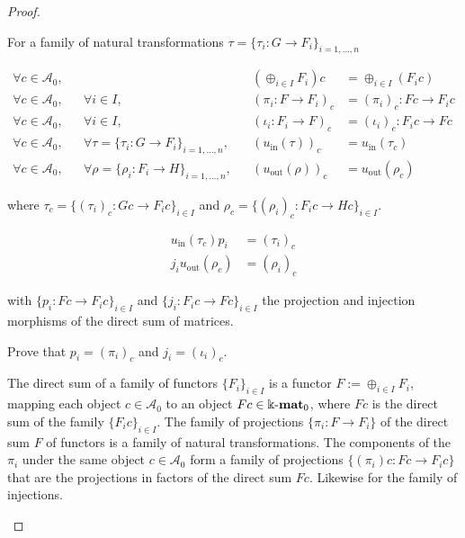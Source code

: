 \begin{proof}
\begin{enumerate}
\begin{subproof}[Proof of (ii)]
For a family of natural transformations $\tau = \{ \tau_{i} : G \rightarrow F_{i} \}_{i = 1,\dots,n}$

\begin{align*}
\forall c \in \mathcal{A}_{0},&& &&  (\oplus_{i \in I} F_{i}) c &= \oplus_{i \in I} (F_{i} c) \\
\forall c \in \mathcal{A}_{0},&& \forall i \in I,&& (\pi_{i} : F \rightarrow F_{i})_{c} &= (\pi_{i})_{c} : Fc \rightarrow F_{i} c \\
\forall c \in \mathcal{A}_{0},&& \forall i \in I,&& (\iota_{i} : F_{i} \rightarrow F)_{c} &= (\iota_{i})_{c} : F_{i} c \rightarrow Fc \\
\forall c \in \mathcal{A}_{0},&& \forall \tau = \{ \tau_{i} : G \rightarrow F_{i} \}_{i = 1,\dots,n},&&
(u_{\mathrm{in}}(\tau))_{c} &= u_{\mathrm{in}}(\tau_{c}) \\
\forall c \in \mathcal{A}_{0},&& \forall \rho = \{ \rho_{i} : F_{i} \rightarrow H \}_{i = 1,\dots,n},&&
(u_{\mathrm{out}}(\rho))_{c} &= u_{\mathrm{out}}(\rho_{c})
\end{align*}

where $\tau_{c} = \{ (\tau_{i})_{c} : Gc \rightarrow F_{i} c \}_{i \in I}$ and $\rho_{c} = \{ (\rho_{i})_{c} : F_{i} c \rightarrow Hc \}_{i \in I}$.

\begin{align*}
u_{\mathrm{in}}(\tau_{c}) p_{i} &= (\tau_{i})_{c} \\
j_{i} u_{\mathrm{out}}(\rho_{c}) &= (\rho_{i})_{c}
\end{align*}

with $\{ p_{i} : Fc \rightarrow F_{i}c \}_{i\in I}$ and $\{ j_{i} : F_{i}c \rightarrow Fc \}_{i \in I}$ the projection and injection morphisms
of the direct sum of matrices.

Prove that $p_{i} = (\pi_{i})_{c}$ and $j_{i} = (\iota_{i})_{c}$.

The direct sum of a family of functors $\{ F_{i}\}_{i \in I}$ is a functor $F := \oplus_{i \in I} F_{i}$, mapping each object $c \in \mathcal{A}_{0}$
to an object $Fc \in \Bbbk\textnormal{-}\mathbf{mat}_{0}$, where $Fc$ is the direct sum of the family $\{ F_{i}c \}_{i \in I}$.
The family of projections $\{ \pi_{i} : F \rightarrow F_{i} \}$ of the direct sum $F$ of functors is a family of natural transformations.
The components of the $\pi_{i}$ under the same object $c \in \mathcal{A}_{0}$ form a family of projections $\{ (\pi_{i})c : Fc \rightarrow F_{i} c\}$
that are the projections in factors of the direct sum $Fc$. Likewise for the family of injections.


\end{subproof}
\end{enumerate}
\end{proof}
